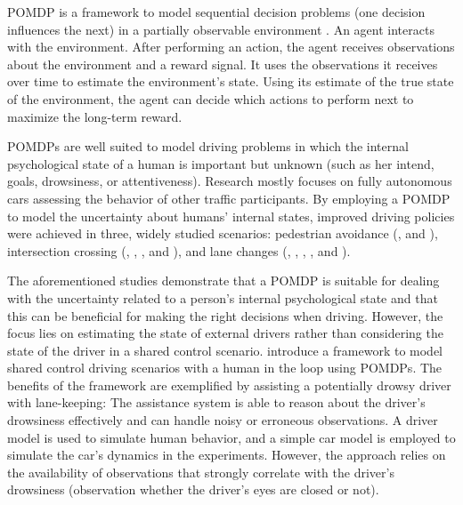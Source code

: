 


POMDP is a framework to model sequential decision problems (one decision influences the next) in a partially observable environment \parencite{pomdp-definition}. An agent interacts with the environment. After performing an action, the agent receives observations about the environment and a reward signal. It uses the observations it receives over time to estimate the environment's state. Using its estimate of the true state of the environment, the agent can decide which actions to perform next to maximize the long-term reward.

POMDPs are well suited to model driving problems in which the internal psychological state of a human is important but unknown (such as her intend, goals, drowsiness, or attentiveness). Research mostly focuses on fully autonomous cars assessing the behavior of other traffic participants. By employing a POMDP to model the uncertainty about humans' internal states, improved driving policies were achieved in three, widely studied scenarios: pedestrian avoidance (\cite{despot-crowd}, and \cite{pomdp-pedestrian-avoid-2}), intersection crossing (\cite{pomdp-intersection}, \cite{att_intersec}, \cite{pomdp-intersection-2}, and \cite{pomdp-intersection-3}), and lane changes (\cite{pomdp-lane-changes}, \cite{att_intersec}, \cite{pomdp-lane-changes-2}, \cite{tactical-decision}, and \cite{pomdp_towards_human}). 

The aforementioned studies demonstrate that a POMDP is suitable for dealing with the uncertainty related to a person's internal psychological state and that this can be beneficial for making the right decisions when driving. However, the focus lies on estimating the state of external drivers rather than considering the state of the driver in a shared control scenario. \cite{hitl_pomdp} introduce a framework to model shared control driving scenarios with a human in the loop using POMDPs. The benefits of the framework are exemplified by assisting a potentially drowsy driver with lane-keeping: The assistance system is able to reason about the driver's drowsiness effectively and can handle noisy or erroneous observations. A driver model is used to simulate human behavior, and a simple car model is employed to simulate the car's dynamics in the experiments. However, the approach relies on the availability of observations that strongly correlate with the driver's drowsiness (observation whether the driver's eyes are closed or not).

